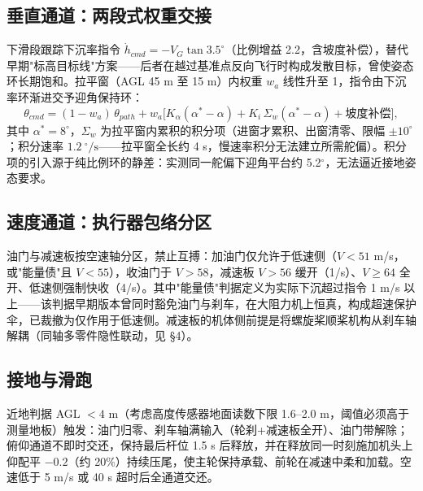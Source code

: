 \documentclass[12pt,UTF8,a4paper]{ctexart}
\begin{document}
\subsection{垂直通道：两段式权重交接}
下滑段跟踪下沉率指令 $\dot h_{cmd} = -V_G \tan 3.5^\circ$（比例增益 2.2，含坡度补偿），替代早期"标高目标线"方案——后者在越过基准点反向飞行时构成发散目标，曾使姿态环长期饱和。拉平窗（AGL 45 m 至 15 m）内权重 $w_a$ 线性升至 1，指令由下沉率环渐进交予迎角保持环：
\[
\theta_{cmd} = (1-w_a)\,\theta_{path} + w_a\big[K_\alpha(\alpha^\ast - \alpha) + K_i\,\Sigma_{w}(\alpha^\ast-\alpha) + \text{坡度补偿}\big],
\]
其中 $\alpha^\ast = 8^\circ$，$\Sigma_{w}$ 为拉平窗内累积的积分项（进窗才累积、出窗清零、限幅 $\pm10^\circ$；积分速率 $1.2\ ^\circ/\mathrm{s}$——拉平窗全长约 4 s，慢速率积分无法建立所需舵偏）。积分项的引入源于纯比例环的静差：实测同一舵偏下迎角平台约 5.2$^\circ$，无法逼近接地姿态要求。

\subsection{速度通道：执行器包络分区}
油门与减速板按空速轴分区，禁止互搏：加油门仅允许于低速侧（$V<51$ m/s，或"能量债"且 $V<55$），收油门于 $V>58$，减速板 $V>56$ 缓开（1/s）、$V\ge64$ 全开、低速侧强制快收（4/s）。其中"能量债"判据定义为实际下沉超过指令 1 m/s 以上——该判据早期版本曾同时豁免油门与刹车，在大阻力机上恒真，构成超速保护伞，已裁撤为仅作用于低速侧。减速板的机体侧前提是将螺旋桨顺桨机构从刹车轴解耦（同轴多零件隐性联动，见 §4）。

\subsection{接地与滑跑}
近地判据 AGL $<4$ m（考虑高度传感器地面读数下限 1.6--2.0 m，阈值必须高于测量地板）触发：油门归零、刹车轴满输入（轮刹+减速板全开）、油门带解除；俯仰通道不即时交还，保持最后杆位 1.5 s 后释放，并在释放同一时刻施加机头上仰配平 $-0.2$（约 20\%）持续压尾，使主轮保持承载、前轮在减速中柔和加载。空速低于 5 m/s 或 40 s 超时后全通道交还。
\end{document}
